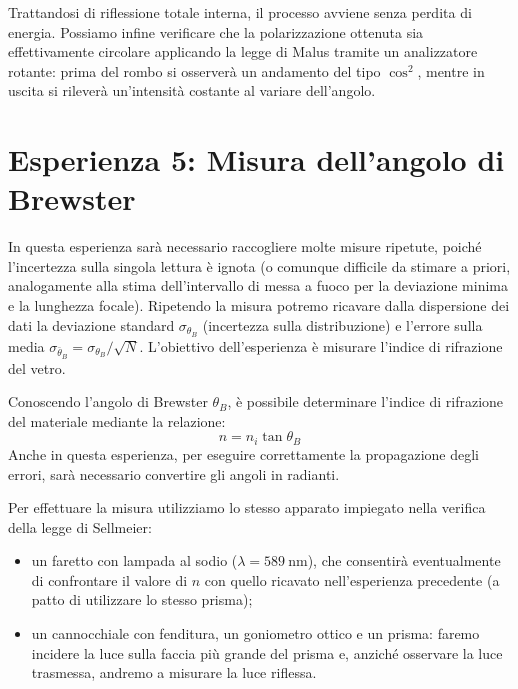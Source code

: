 \documentclass[openany,a4paper,12pt]{book}
\begin{document}
\begin{figure}[H]
\end{figure}

Trattandosi di riflessione totale interna, il processo avviene senza perdita di energia. Possiamo infine verificare che la polarizzazione ottenuta sia effettivamente circolare applicando la legge di Malus tramite un analizzatore rotante: prima del rombo si osserverà un andamento del tipo $\cos^2$, mentre in uscita si rileverà un'intensità costante al variare dell'angolo.

\section{Esperienza 5: Misura dell'angolo di Brewster}

In questa esperienza sarà necessario raccogliere molte misure ripetute, poiché l'incertezza sulla singola lettura è ignota (o comunque difficile da stimare a priori, analogamente alla stima dell'intervallo di messa a fuoco per la deviazione minima e la lunghezza focale). Ripetendo la misura potremo ricavare dalla dispersione dei dati la deviazione standard $\sigma_{\theta_B}$ (incertezza sulla distribuzione) e l'errore sulla media $\sigma_{\bar{\theta}_B} = \sigma_{\theta_B} / \sqrt{N}$.
L'obiettivo dell'esperienza è misurare l'indice di rifrazione del vetro.

Conoscendo l'angolo di Brewster $\theta_B$, è possibile determinare l'indice di rifrazione del materiale mediante la relazione:
\[
    n = n_i \tan\theta_B
\]
Anche in questa esperienza, per eseguire correttamente la propagazione degli errori, sarà necessario convertire gli angoli in radianti.

Per effettuare la misura utilizziamo lo stesso apparato impiegato nella verifica della legge di Sellmeier:
\begin{itemize}
    \item un faretto con lampada al sodio ($\lambda = \SI{589}{\nano\meter}$), che consentirà eventualmente di confrontare il valore di $n$ con quello ricavato nell'esperienza precedente (a patto di utilizzare lo stesso prisma);
    \item un cannocchiale con fenditura, un goniometro ottico e un prisma: faremo incidere la luce sulla faccia più grande del prisma e, anziché osservare la luce trasmessa, andremo a misurare la luce riflessa.
\end{itemize}
\end{document}
